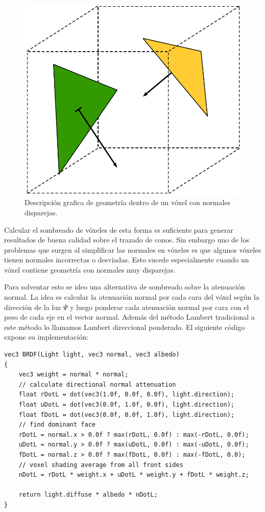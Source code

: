 \begin{figure}
	\centering
	\captionsetup{justification=centering}
	\includegraphics[width=\linewidth]{media/gimped_normals.pdf}
	\caption{Descripción grafica de geometría dentro de un vóxel con normales disparejas.}
	\label{fig:error_normals}
\end{figure}
Calcular el sombreado de vóxeles de esta forma es suficiente para generar resultados de buena calidad sobre el trazado de conos. Sin embargo uno de los problemas que surgen al simplificar las normales en vóxeles es que algunos vóxeles tienen normales incorrectas o desviadas. Esto sucede especialmente cuando un vóxel contiene geometría con normales muy disparejas. 

Para solventar esto se ideo una alternativa de sombreado sobre la atenuación normal. La idea es calcular la atenuación normal por cada cara del vóxel según la dirección de la luz $\Psi$ y luego ponderar cada atenuación normal por cara con el peso de cada eje en el vector normal. Además del método Lambert tradicional a este método lo llamamos Lambert direccional ponderado. El siguiente código expone su implementación:
\\
\begin{lstlisting}[caption={Sombreado direccional y ponderado según la normal para un vóxel}, label=Shading2]
vec3 BRDF(Light light, vec3 normal, vec3 albedo)
{
    vec3 weight = normal * normal;
    // calculate directional normal attenuation
    float rDotL = dot(vec3(1.0f, 0.0f, 0.0f), light.direction);
    float uDotL = dot(vec3(0.0f, 1.0f, 0.0f), light.direction);
    float fDotL = dot(vec3(0.0f, 0.0f, 1.0f), light.direction);
    // find dominant face
    rDotL = normal.x > 0.0f ? max(rDotL, 0.0f) : max(-rDotL, 0.0f);
    uDotL = normal.y > 0.0f ? max(uDotL, 0.0f) : max(-uDotL, 0.0f);
    fDotL = normal.z > 0.0f ? max(fDotL, 0.0f) : max(-fDotL, 0.0);
    // voxel shading average from all front sides
    nDotL = rDotL * weight.x + uDotL * weight.y + fDotL * weight.z;

    return light.diffuse * albedo * nDotL;
}
\end{lstlisting}

